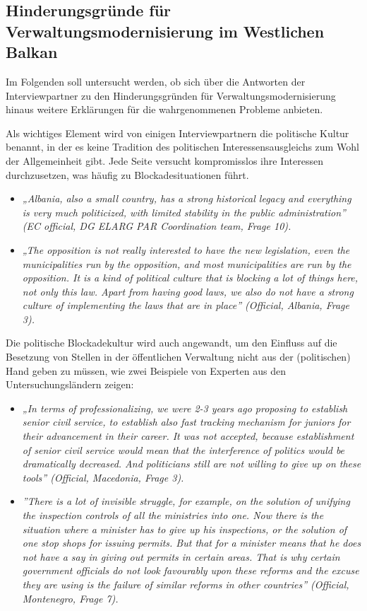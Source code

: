 \subsection{Hinderungsgründe für Verwaltungsmodernisierung im Westlichen Balkan}

Im Folgenden soll untersucht werden, ob sich über die Antworten der Interviewpartner zu den Hinderungsgründen für Verwaltungsmodernisierung hinaus weitere Erklärungen für die wahrgenommenen Probleme anbieten.\par
Als wichtiges Element wird von einigen Interviewpartnern die politische Kultur benannt, in der es keine Tradition des politischen Interessensausgleichs zum Wohl der Allgemeinheit gibt. Jede Seite versucht kompromisslos ihre Interessen durchzusetzen, was häufig zu Blockadesituationen führt.
\begin{itemize}[label={}]
\item \textit{„Albania, also a small country, has a strong historical legacy and everything is very much politicized, with limited stability in the public administration” (EC official, DG ELARG PAR Coordination team, Frage 10).}
\item \textit{„The opposition is not really interested to have the new legislation, even the municipalities run by the opposition, and most municipalities are run by the opposition. It is a kind of political culture that is blocking a lot of things here, not only this law. Apart from having good laws, we also do not have a strong culture of implementing the laws that are in place” (Official, Albania, Frage 3).}
\end{itemize}
Die politische Blockadekultur wird auch angewandt, um den Einfluss auf die Besetzung von Stellen in der öffentlichen Verwaltung nicht aus der (politischen) Hand geben zu müssen, wie zwei Beispiele von Experten aus den Untersuchungsländern zeigen:
\begin{itemize}[label={}]
\item \textit{„In terms of professionalizing, we were 2-3 years ago proposing to establish senior civil service, to establish also fast tracking mechanism for juniors for their advancement in their career. It was not accepted, because establishment of senior civil service would mean that the interference of politics would be dramatically decreased. And politicians still are not willing to give up on these tools” (Official, Macedonia, Frage 3).}
\item \textit{”There is a lot of invisible struggle, for example, on the solution of unifying the inspection controls of all the ministries into one. Now there is the situation where a minister has to give up his inspections, or the solution of one stop shops for issuing permits. But that for a minister means that he does not have a say in giving out permits in certain areas. That is why certain government officials do not look favourably upon these reforms and the excuse they are using is the failure of similar reforms in other countries” (Official, Montenegro, Frage 7).}
\end{itemize}
